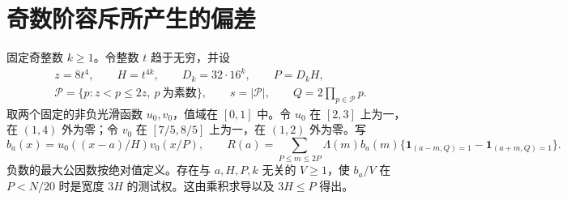 \documentclass[UTF8,a4paper,11pt,fontset=fandol]{ctexart}
\newcommand{\Lam}{\Lambda}
\newcommand{\ind}{\mathbf 1}
\begin{document}
\section{奇数阶容斥所产生的偏差}
固定奇整数 \(k\ge1\)。令整数 \(t\) 趋于无穷，并设
\[
 \begin{gathered}
 z=8t^4,\qquad H=t^{4k},\qquad D_k=32\cdot16^k,\qquad P=D_kH,\\
 \mathcal P=\{p:z<p\le2z,\ p\ \text{为素数}\},\qquad
 s=|\mathcal P|,\qquad Q=2\prod_{p\in\mathcal P}p .
 \end{gathered}
\]
取两个固定的非负光滑函数 \(u_0,v_0\)，值域在 \([0,1]\) 中。令 \(u_0\) 在 \([2,3]\) 上为一，在 \((1,4)\) 外为零；令 \(v_0\) 在 \([7/5,8/5]\) 上为一，在 \((1,2)\) 外为零。写
\[
 b_a(x)=u_0((x-a)/H)v_0(x/P),\qquad
 R(a)=\sum_{P\le m\le 2P}\Lam(m)b_a(m)
          \{\ind_{(a-m,Q)=1}-\ind_{(a+m,Q)=1}\}.
\]
负数的最大公因数按绝对值定义。存在与 \(a,H,P,k\) 无关的 \(V\ge1\)，使 \(b_a/V\) 在 \(P<N/20\) 时是宽度 \(3H\) 的测试权。这由乘积求导以及 \(3H\le P\) 得出。
\end{document}
